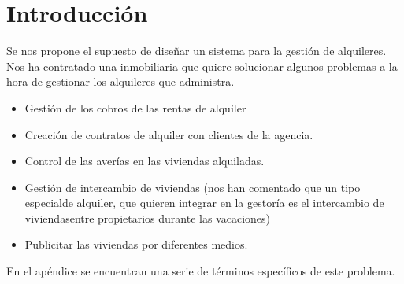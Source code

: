 \section{Introducción}

Se nos propone el supuesto de diseñar un sistema para la gestión de alquileres. Nos ha contratado una inmobiliaria que quiere solucionar algunos problemas a la hora de gestionar los alquileres que administra.

\begin{itemize}
	\item Gestión de los cobros de las rentas de alquiler
	\item Creación de contratos de alquiler con clientes de la agencia.
	\item Control de las averías en las viviendas alquiladas.
	\item Gestión de intercambio de viviendas (nos han comentado que un tipo especialde alquiler, que quieren integrar en la gestoría es el intercambio de viviendasentre propietarios durante las vacaciones)
	\item Publicitar las viviendas por diferentes medios.
\end{itemize}

En el apéndice se encuentran una serie de términos específicos de este problema.